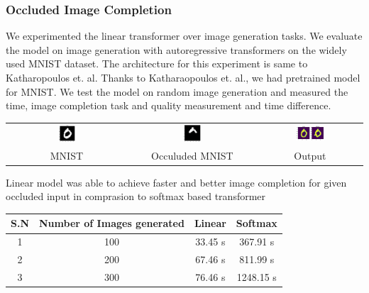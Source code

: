 \documentclass{article}
\begin{document}
\subsubsection{Occluded Image Completion}
We experimented the linear transformer over image generation tasks. We evaluate the model on image generation with autoregressive transformers on the widely used MNIST dataset. The architecture for this experiment is same to Katharopoulos et. al. Thanks to Katharaopoulos et. al., we had pretrained model for MNIST. We test the model on random image generation and measured the time, image completion task and quality measurement and time difference. 
\begin{center}
    \begin{tabular}{c c c }
        \includegraphics[width=0.15\textwidth]{images/input0.png} & \includegraphics[width=0.15\textwidth]{images/occuluded0.png} & \includegraphics[width=0.3\textwidth]{images/result0.png} \\
		MNIST & Occuluded MNIST & Output
    \end{tabular}
\end{center}
    {Linear model was able to achieve faster and better image completion for given occluded input in comprasion to softmax based transformer}

\begin{tabular}{c|c|c|c}
    S.N & Number of Images generated & Linear & Softmax \\
    \hline
     1 & 100 & 33.45 s & 367.91 s\\
     2 & 200 & 67.46 s & 811.99 s\\
     3 & 300 & 76.46 s & 1248.15 s\\

\end{tabular}
\end{document}

